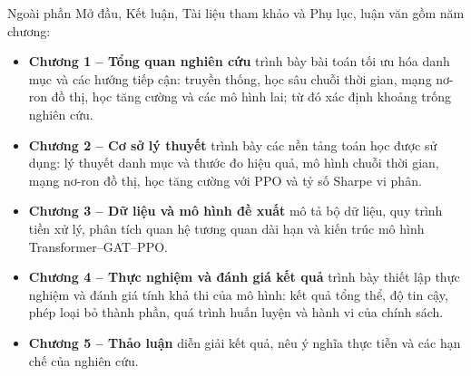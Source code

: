 Ngoài phần Mở đầu, Kết luận, Tài liệu tham khảo và Phụ lục, luận văn gồm năm chương:
\begin{itemize}
  \item \textbf{Chương 1 -- Tổng quan nghiên cứu} trình bày bài toán tối ưu hóa danh mục và các hướng tiếp cận: truyền thống, học sâu chuỗi thời gian, mạng nơ-ron đồ thị, học tăng cường và các mô hình lai; từ đó xác định khoảng trống nghiên cứu.
  \item \textbf{Chương 2 -- Cơ sở lý thuyết} trình bày các nền tảng toán học được sử dụng: lý thuyết danh mục và thước đo hiệu quả, mô hình chuỗi thời gian, mạng nơ-ron đồ thị, học tăng cường với PPO và tỷ số Sharpe vi phân.
  \item \textbf{Chương 3 -- Dữ liệu và mô hình đề xuất} mô tả bộ dữ liệu, quy trình tiền xử lý, phân tích quan hệ tương quan dài hạn và kiến trúc mô hình Transformer--GAT--PPO.
  \item \textbf{Chương 4 -- Thực nghiệm và đánh giá kết quả} trình bày thiết lập thực nghiệm và đánh giá tính khả thi của mô hình: kết quả tổng thể, độ tin cậy, phép loại bỏ thành phần, quá trình huấn luyện và hành vi của chính sách.
  \item \textbf{Chương 5 -- Thảo luận} diễn giải kết quả, nêu ý nghĩa thực tiễn và các hạn chế của nghiên cứu.
\end{itemize}
